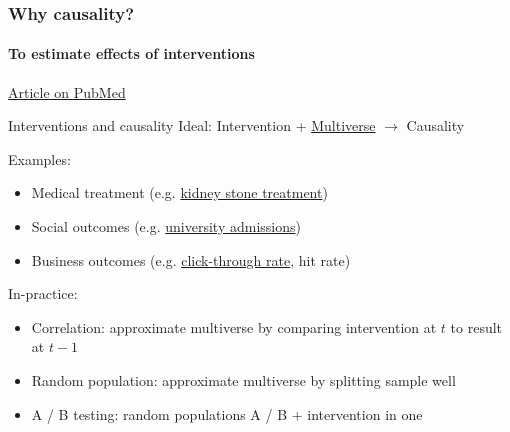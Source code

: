 \begin{frame}
\frametitle{Why causality?}
\framesubtitle{To estimate effects of interventions}
\centering
{}

\href{https://pubmed.ncbi.nlm.nih.gov/29897866/}{Article on PubMed}
\end{frame}

\begin{frame}{Interventions and causality}
    Ideal: Intervention + \href{https://en.wikipedia.org/wiki/Multiverse}{Multiverse} $\rightarrow$ Causality\newline

    Examples:
    \begin{itemize}
        \item Medical treatment (e.g. \href{https://en.wikipedia.org/wiki/Simpson\%27s_paradox\#Kidney_stone_treatment}{kidney stone treatment})
        \item Social outcomes (e.g. \href{https://en.wikipedia.org/wiki/Simpson\%27s_paradox\#UC_Berkeley_gender_bias}{university admissions})
        \item Business outcomes (e.g. \href{https://en.wikipedia.org/wiki/Click-through\_rate}{click-through rate}, hit rate)\newline
    \end{itemize}

    In-practice:
    \begin{itemize}
        \item Correlation: approximate multiverse by comparing intervention at $t$ to result at $t-1$
        \item Random population: approximate multiverse by splitting sample well
        \item A / B testing: random populations A / B + intervention in one
    \end{itemize}
\end{frame}


